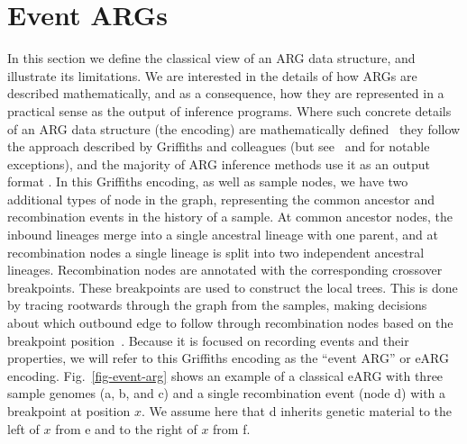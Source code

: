 \documentclass{article}
\newcommand{\noderef}[1]{\textsf{#1}}
\begin{document}
\section{Event ARGs}
\label{sec-eARG}
In this section we define the classical view of an ARG data structure,
and illustrate its limitations. We are
interested in the details of how ARGs are described mathematically,
and as a consequence, how they are represented in a practical sense
as the output of inference programs.
Where such concrete details of an ARG data structure
(the encoding) are
mathematically defined~\citep[e.g.][]{
rasmussen2014genome,gusfield2014recombinatorics,ignatieva2021kwarg}
they follow the approach described by Griffiths and colleagues
(but see~\citet{parida2011minimal} and \citet{zhang2023biobank}
for notable exceptions), and the majority of
ARG inference methods use it as an output format
\citep[(TODO exhaustive list)][]{rasmussen2014genome,ignatieva2021kwarg}.
In this Griffiths encoding, as well as sample nodes,
we have two additional types of node in the graph,
representing the common ancestor and recombination events
in the history of a sample.
At common ancestor nodes, the inbound lineages merge into a
single ancestral lineage with one parent, and at recombination
nodes a single lineage is split into two independent
ancestral lineages. Recombination nodes are annotated with
the corresponding crossover breakpoints. These breakpoints
are used to construct the local trees.
This is done by tracing rootwards through the graph from the samples,
making decisions about which outbound edge to follow through
recombination nodes based on the breakpoint
position~\citep{griffiths1996ancestral}.
Because it is focused on recording events and their properties,
we will refer to this Griffiths encoding as the ``event ARG'' or eARG
encoding. Fig.~\ref{fig-event-arg} shows an example of a classical
eARG with three sample genomes (\noderef{a}, \noderef{b}, and \noderef{c})
and a single recombination event (node \noderef{d}) with a breakpoint
at position $x$.
We assume here that \noderef{d} inherits genetic material to the
left of $x$ from \noderef{e} and to the right of $x$ from \noderef{f}.
\end{document}
